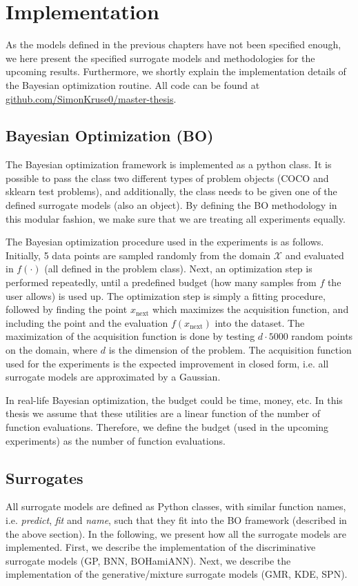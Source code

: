 \chapter{Implementation}
As the models defined in the previous chapters have not been specified enough, we here 
present the specified surrogate models and methodologies for the upcoming results. Furthermore, 
we shortly explain the implementation details of the Bayesian optimization routine. All code
can be found at \url{github.com/SimonKruse0/master-thesis}.

\section{Bayesian Optimization (BO)}\label{BO_implementation}
The Bayesian optimization framework is implemented as a python class. It is possible to pass the class two
different types of problem objects (COCO and sklearn test problems), and additionally, the class
needs to be given one of the defined surrogate models (also an object). By defining the BO methodology
in this modular fashion, we make sure that we are treating all experiments equally. 

The Bayesian optimization procedure used in the experiments is as follows. Initially, 5 data points
are sampled randomly from the domain $\mathcal{X}$ and evaluated in $f(\cdot)$ (all defined in the
problem class). Next, an optimization step is performed repeatedly, until a predefined budget (how
many samples from $f$ the user allows) is used up. The optimization step is simply a fitting
procedure, followed by finding the point $x_{\text{next}}$ which maximizes the acquisition function,
and including the point and the evaluation $f(x_{\text{next}})$ into the dataset. The maximization
of the acquisition function is done by testing $d\cdot 5000$ random points on the domain, where $d$
is the dimension of the problem. The acquisition function used for the experiments is the expected
improvement in closed form, i.e. all surrogate models are approximated by a Gaussian. 

\begin{note2}[Budget]
  In real-life Bayesian optimization, the budget could be time, money, etc. In this thesis we assume
that these utilities are a linear function of the number of function evaluations. Therefore, we
define the budget (used in the upcoming experiments) as the number of function evaluations.
\end{note2}

\section{Surrogates}
All surrogate models are defined as Python classes, with similar function names, i.e.
\textit{predict}, \textit{fit} and \textit{name}, such that they fit into the BO framework
(described in the above section). In the following, we present how all the surrogate models are
implemented. First, we describe the implementation of the discriminative surrogate models (GP, BNN, BOHamiANN). Next,  
we describe the implementation of the generative/mixture surrogate models (GMR, KDE, SPN). 

